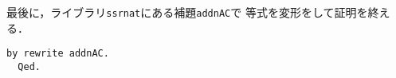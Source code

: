 最後に，ライブラリ{\tt{ssrnat}}にある補題{\tt{addnAC}}で
等式を変形をして証明を終える．
\begin{lstlisting}[language=Coq]
    by rewrite addnAC.
  Qed.
\end{lstlisting}



